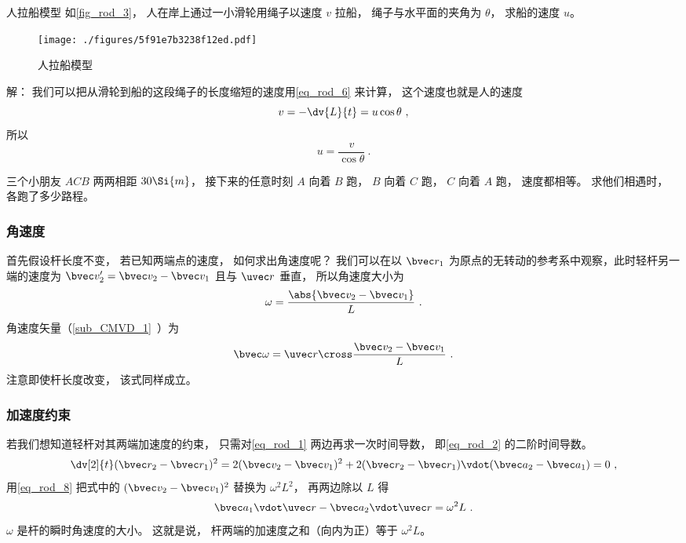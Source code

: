 \begin{example}{人拉船模型}\label{ex_rod_2}
如\autoref{fig_rod_3}， 人在岸上通过一小滑轮用绳子以速度 $v$ 拉船， 绳子与水平面的夹角为 $\theta$， 求船的速度 $u$。
\begin{figure}[ht]
\centering
\texttt{[image: ./figures/5f91e7b3238f12ed.pdf]}
\caption{人拉船模型} \label{fig_rod_3}
\end{figure}

解： 我们可以把从滑轮到船的这段绳子的长度缩短的速度用\autoref{eq_rod_6} 来计算， 这个速度也就是人的速度
\begin{equation}
v = -\dv{L}{t} = u \cos\theta~,
\end{equation}
所以
\begin{equation}
u = \frac{v}{\cos\theta}~.
\end{equation}
\end{example}

\begin{exercise}{}
三个小朋友 $ACB$ 两两相距 $30\Si{m}$， 接下来的任意时刻 $A$ 向着 $B$ 跑， $B$ 向着 $C$ 跑， $C$ 向着 $A$ 跑， 速度都相等。 求他们相遇时， 各跑了多少路程。
\end{exercise}

\subsubsection{角速度}

首先假设杆长度不变， 若已知两端点的速度， 如何求出角速度呢？ 我们可以在以 $\bvec r_1$ 为原点的无转动的参考系中观察，此时轻杆另一端的速度为 $\bvec v_2' = \bvec v_2 - \bvec v_1$ 且与 $\uvec r$ 垂直， 所以角速度大小为
\begin{equation}\label{eq_rod_8}
\omega = \frac{\abs{\bvec v_2 - \bvec v_1}}{L}~.
\end{equation}
角速度矢量（\autoref{sub_CMVD_1}~）为
\begin{equation}\label{eq_rod_4}
\bvec \omega = \uvec r \cross \frac{\bvec v_2 - \bvec v_1}{L}~.
\end{equation}
注意即使杆长度改变， 该式同样成立。

\subsubsection{加速度约束}
若我们想知道轻杆对其两端加速度的约束， 只需对\autoref{eq_rod_1} 两边再求一次时间导数， 即\autoref{eq_rod_2} 的二阶时间导数。
\begin{equation}
\dv[2]{t} (\bvec r_2 - \bvec r_1)^2 = 2(\bvec v_2 - \bvec v_1)^2 + 2(\bvec r_2 - \bvec r_1) \vdot (\bvec a_2 - \bvec a_1) = 0~,
\end{equation}
用\autoref{eq_rod_8} 把式中的 $(\bvec v_2 - \bvec v_1)^2$ 替换为 $\omega^2 L^2$， 再两边除以 $L$ 得
\begin{equation}\label{eq_rod_5}
\bvec a_1 \vdot \uvec r - \bvec a_2 \vdot \uvec r  = \omega^2 L~.
\end{equation}
$\omega$ 是杆的瞬时角速度的大小。 这就是说， 杆两端的加速度之和（向内为正）等于 $\omega^2L$。

